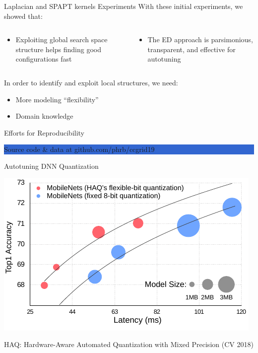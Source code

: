 \documentclass[10pt, compress, aspectratio=169, xcolor={table,usenames,dvipsnames}]{beamer}
\begin{document}
\begin{frame}[label={sec:org43744f4}]{Laplacian and SPAPT kernels Experiments}
With these initial experiments, we showed that:

\begin{columns}
\begin{column}{0.5\columnwidth}
\begin{itemize}
\item Exploiting \alert{global search space structure} helps finding good configurations
fast
\end{itemize}
\end{column}
\begin{column}{0.5\columnwidth}
\begin{itemize}
\item The ED approach is parsimonious, transparent, and \alert{effective} for autotuning
\end{itemize}
\end{column}
\end{columns}
\vspace{0.5cm}
In order  to identify  and exploit \alert{local  structures}, we  need:

\begin{itemize}
\item More \alert{modeling ``flexibility''}
\item \alert{Domain knowledge}
\end{itemize}

\begin{block}{Efforts for Reproducibility}
\begin{center}
\colorbox{Highlight}{\parbox[c]{0.54\textwidth}{\centering \alert{Source code} \& \alert{data} at github.com/phrb/ccgrid19}}
\end{center}
\end{block}
\end{frame}


\begin{frame}[label={sec:org4e9112c}]{Autotuning DNN Quantization}
\begin{center}
\includegraphics[width=.7\columnwidth]{../../../img/haq_quantization_II.pdf}
\end{center}

\begin{center}
\scriptsize{HAQ: Hardware-Aware Automated Quantization with Mixed Precision (CV 2018)}
\end{center}
\end{frame}
\end{document}
